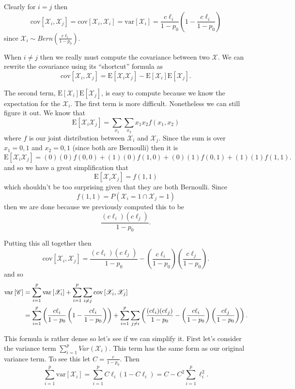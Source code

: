 \documentclass{book}
\begin{document}
Clearly for $i=j$ then 
$$
\text{cov}\left[\mathscr{X}_i,\mathscr{X}_j\right]=\text{cov}\left[\mathscr{X}_i,\mathscr{X}_i\right]=\text{var}\left[\mathscr{X}_i\right]=\frac{c\ell_i}{1-p_0}\left(1-\frac{c\ell_i}{1-p_0}\right)
$$
since $\mathscr{X}_i \sim Bern\left(\frac{c\ell_i}{1-p_0}\right)$.

When $i \neq j$ then we really must compute the covariance between two $\mathscr{X}$. We can rewrite the covariance using its ``shortcut'' formula as
$$
\text{cov}\left[\mathscr{X}_i,\mathscr{X}_j\right]=\text{E}[\mathscr{X}_i\mathscr{X}_j]-\text{E}[\mathscr{X}_i]\text{E}[\mathscr{X}_j].
$$

The second term, $\text{E}[\mathscr{X}_i]\text{E}[\mathscr{X}_j]$, is easy to compute because we know the expectation for the $\mathscr{X}_i$. The first term is more difficult. Nonetheless we can still figure it out. We know that
$$
\text{E}[\mathscr{X}_i\mathscr{X}_j]=\sum_{x_1}\sum_{x_2}x_1x_2f(x_1,x_2)
$$
where $f$ is our joint distribution between $\mathscr{X}_i$ and $\mathscr{X}_j$. Since the sum is over $x_1=0,1$ and $x_2=0,1$ (since both are Bernoulli) then it is
$$
\text{E}[\mathscr{X}_i\mathscr{X}_j]=(0)(0)f(0,0)+(1)(0)f(1,0)+(0)(1)f(0,1)+(1)(1)f(1,1).
$$
and so we have a great simplification that 
$$
\text{E}[\mathscr{X}_i\mathscr{X}_j]=f(1,1)
$$
which shouldn't be too surprising given that they are both Bernoulli. Since 
$$
f(1,1)=P(\mathscr{X}_i=1 \cap \mathscr{X}_j=1)
$$ 
then we are done because we previously computed this to be
$$
\frac{(c\ell_i)(c\ell_j)}{1-p_0}.
$$

Putting this all together then 
$$
\text{cov}\left[\mathscr{X}_i,\mathscr{X}_j\right]=\frac{(c\ell_i)(c\ell_j)}{1-p_0}-\left(\frac{c\ell_i}{1-p_0}\right)\left(\frac{c\ell_j}{1-p_0}\right).
$$
and so
\begin{align}
\text{var}\left[\mathscr{C}\right]&=\sum_{i=1}^{p}\text{var}\left[\mathscr{X}_i\right]+\sum_{i=1}^{p}\sum_{i \neq j}\text{cov}\left[\mathscr{X}_i,\mathscr{X}_j\right]\notag\\
&=\sum_{i=1}^{p}\left(\frac{c\ell_i}{1-p_0}\left(1-\frac{c\ell_i}{1-p_0}\right)\right)+\sum_{i=1}^{p}\sum_{j\neq i}\left(\frac{(c\ell_i)(c\ell_j)}{1-p_0}-\left(\frac{c\ell_i}{1-p_0}\right)\left(\frac{c\ell_j}{1-p_0}\right)\right).\notag
\end{align}

This formula is rather dense so let's see if we can simplify it. First let's consider the variance term $\sum_{i=1}^{p}Var(\mathscr{X}_i)$. This term has the same form as our original variance term. To see this let $C=\frac{c}{1-p_0}$. Then
$$
\sum_{i=1}^{p}\text{var}\left[\mathscr{X}_i\right]=\sum_{i=1}^{p}C\ell_i(1-C\ell_i)=C-C^2\sum_{i=1}^{p}\ell_i^2.
$$
\end{document}
